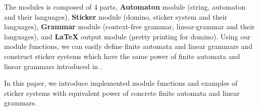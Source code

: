 The modules is composed of 4 parts,
{\bf Automaton} module
(string, automaton and their languages),
{\bf Sticker} module
(domino, sticker system and their languages),
{\bf Grammar} module
(context-free grammar, linear-grammar and their languages),
and {\bf \LaTeX} output module
(pretty printing for domino).
Using our module functions, we can easily define finite automata
and linear grammars and construct sticker systems which have the
same power of finite automata and linear grammars
introduced in \cite{paun1998}.

In this paper, we introduce implemented module functions and
examples of sticker systems with equivalent power of 
concrete finite automata and linear grammars.
